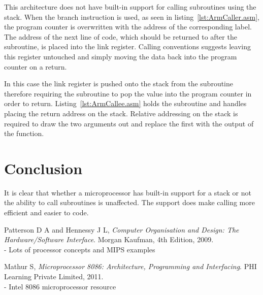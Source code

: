 \documentclass[12pt,a4paper]{article}
\begin{document}
This architecture does not have built-in support for calling subroutines using the stack.
When the branch instruction is used, as seen in listing~\ref{lst:ArmCaller.asm}, the program counter is overwritten with the address of the corresponding label.
The address of the next line of code, which should be returned to after the subroutine, is placed into the link register.
Calling conventions suggests leaving this register untouched and simply moving the data back into the program counter on a return.


In this case the link register is pushed onto the stack from the subroutine therefore requiring the subroutine to pop the value into the program counter in order to return.
Listing~\ref{lst:ArmCallee.asm} holds the subroutine and handles placing the return address on the stack.
Relative addressing on the stack is required to draw the two arguments out and replace the first with the output of the function.







\section{Conclusion}

It is clear that whether a microprocessor has built-in support for a stack or not the ability to call subroutines is unaffected.
The support does make calling more efficient and easier to code. 




\renewcommand{\refname}{Bibliography}
\begin{thebibliography}{9}

  Patterson D A and Hennessy J L,
  \emph{Computer Organisation and Design: The Hardware/Software Interface}.
  Morgan Kaufman,
  4th Edition,
  2009.\\
  - Lots of processor concepts and MIPS examples

  Mathur S,
  \emph{Microprocessor 8086: Architecture, Programming and Interfacing}.
  PHI Learning Private Limited,
  2011.\\
  - Intel 8086 microprocessor resource


\end{thebibliography}
\end{document}

